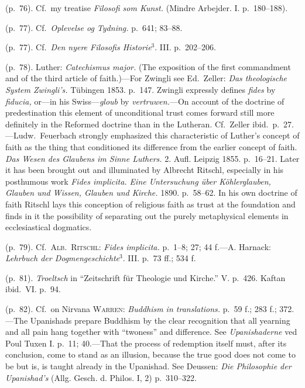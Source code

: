 \documentclass[12pt,a4paper]{book}
\newcommand{\opage}[1]{\marginnote{\footnotesize\textit{[#1]}}}
\begin{document}
 (p.~76). Cf.\ my treatise \emph{Filosofi som Kunst.} (Mindre Arbejder. I. p.~180--188).

 (p.~77). Cf.\ \emph{Oplevelse og Tydning.} p.~641; 83--88.

 (p.~77). Cf.\ \emph{Den nyere Filosofis Historie}$^3$. III. p.~202--206.

 (p.~78). Luther: \emph{Catechismus major.} (The exposition of the first commandment and of the
third article of faith.)---For Zwingli see Ed.\ Zeller: \emph{Das theologische System Zwingli's.}
Tübingen 1853. p.~147. Zwingli expressly defines \emph{fides} by \emph{fiducia,} or---in his
Swiss---\emph{gloub} by \emph{vertruwen.}---On account of the doctrine of predestination this
element of unconditional trust comes forward still more definitely in the Reformed doctrine than in
the Lutheran. Cf.\ Zeller ibid.\ p.~27.---Ludw.\ Feuerbach strongly emphasized this characteristic
of Luther's concept of faith as the thing that conditioned its difference from the earlier concept
of faith. \emph{Das Wesen des Glaubens im Sinne Luthers.} 2. Aufl. Leipzig 1855. p.~16--21. Later it
has been brought out and illuminated by Albrecht Ritschl, especially in his posthumous work
\emph{Fides implicita. Eine Untersuchung über Köhlerglauben, Glauben und Wissen, Glauben und
Kirche.} 1890. p.~58--62. In his own doctrine of faith Ritschl lays this conception of religious
faith as trust at the foundation and finds in it the possibility of separating out the purely
metaphysical elements in ecclesiastical dogmatics.

 (p.~79). Cf.\ \textsc{Alb.\ Ritschl}: \emph{Fides implicita.} p.~1--8; 27; 44 f.---A. Harnack:
\emph{Lehrbuch der Dogmengeschichte}$^3$. III. p.~73 ff.; 534 f.

 (p.~81). \emph{Troeltsch} in ``Zeitschrift für Theologie und Kirche.'' V. p.~426. Kaftan ibid.\
VI. p.~94.

 (p.~82). Cf.\ on Nirvana \textsc{Warren}: \emph{Buddhism in translations.} p.~59 f.; 283 f.;
372.---The Upanishads prepare Buddhism by the clear recognition 
\opage{249}that all yearning and all pain hang
together with ``twoness'' and difference. See \emph{Upanishaderne} ved Poul Tuxen I. p.~11;
40.---That the process of redemption itself must, after its conclusion, come to stand as an
illusion, because the true good does not come to be but is, is taught already in the Upanishad. See
Deussen: \emph{Die Philosophie der Upanishad's} (Allg. Gesch. d. Philos. I, 2) p.~310--322.
\end{document}
